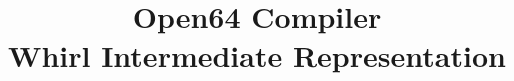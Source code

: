 \documentclass[letterpaper]{book}
\begin{document}
\title{\Huge\bf Open64 Compiler\\
Whirl Intermediate Representation}
\maketitle
\tableofcontents
\clearpage


\clearpage
{}
\printindex
\end{document}
